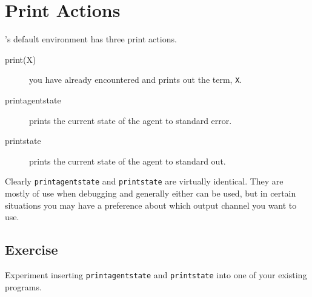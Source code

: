 \section{Print Actions}

\gwendolen's default environment has three print actions.
\begin{description}
\item[print(X)] you have already encountered and prints out the term, \lstinline{X}.
\item[printagentstate] prints the current state of the agent to standard error.
\item[printstate] prints the current state of the agent to standard out.
\end{description}
Clearly \lstinline{printagentstate} and \lstinline{printstate} are virtually identical.  They are mostly of use when debugging and generally either can be used, but in certain situations you may have a preference about which output channel you want to use.

\subsection{Exercise}
Experiment inserting \lstinline{printagentstate} and \lstinline{printstate} into one of your existing programs.

